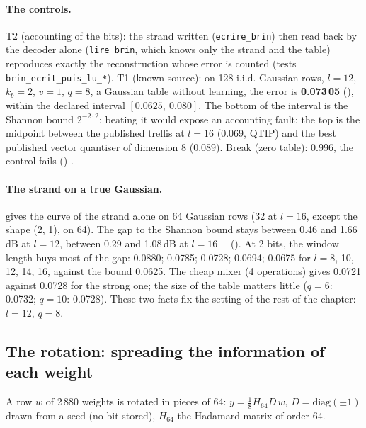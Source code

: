\paragraph{The controls.} T2 (accounting of the bits): the strand written (\texttt{ecrire\_brin}) then read back by the decoder alone (\texttt{lire\_brin}, which knows only the strand and the table) reproduces exactly the reconstruction whose error is counted (tests \texttt{brin\_ecrit\_puis\_lu\_*}). T1 (known source): on 128 i.i.d. Gaussian rows, $l = 12$, $k_b = 2$, $v = 1$, $q = 8$, a Gaussian table without learning, the error is \textbf{0.073\,05} (), within the declared interval $[0.0625,\ 0.080]$. The bottom of the interval is the Shannon bound $2^{-2\cdot 2}$: beating it would expose an accounting fault; the top is the midpoint between the published trellis at $l = 16$ (0.069, QTIP) and the best published vector quantiser of dimension 8 (0.089). Break (zero table): 0.996, the control fails () \mes.

\begin{figure}[tbp]
\centering
\GrapheGenGauss
{}
\label{fig:t3-gen-gauss}
\end{figure}

\paragraph{The strand on a true Gaussian.}  gives the curve of the strand alone on 64 Gaussian rows (32 at $l = 16$, except the shape (2, 1), on 64). The gap to the Shannon bound stays between 0.46 and 1.66\,dB at $l = 12$, between 0.29 and 1.08\,dB at $l = 16$ \mes~\calc~(). At 2 bits, the window length buys most of the gap: 0.0880; 0.0785; 0.0728; 0.0694; 0.0675 for $l = 8$, 10, 12, 14, 16, against the bound 0.0625. The cheap mixer (4 operations) gives 0.0721 against 0.0728 for the strong one; the size of the table matters little ($q = 6$: 0.0732; $q = 10$: 0.0728). These two facts fix the setting of the rest of the chapter: $l = 12$, $q = 8$.

\subsection{The rotation: spreading the information of each weight}

A row $w$ of 2\,880 weights is rotated in pieces of 64: $y = \frac18 H_{64} D\, w$, $D = \mathrm{diag}(\pm1)$ drawn from a seed (no bit stored), $H_{64}$ the Hadamard matrix of order 64.

